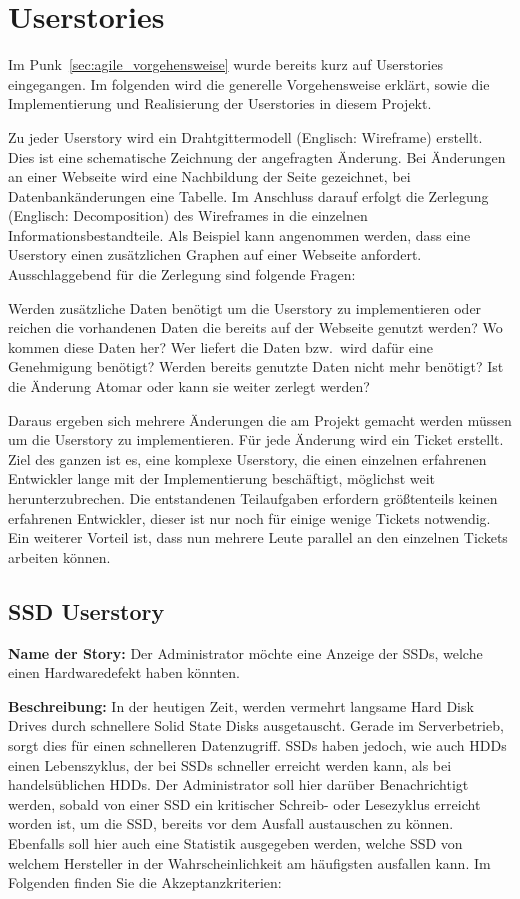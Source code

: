 \chapter{Userstories}
Im Punk~\ref{sec:agile_vorgehensweise} wurde bereits kurz auf Userstories
eingegangen. Im folgenden wird die generelle Vorgehensweise erklärt, sowie die
Implementierung und Realisierung der Userstories in diesem Projekt.

Zu jeder Userstory wird ein Drahtgittermodell (Englisch: Wireframe) erstellt.
Dies ist eine schematische Zeichnung der angefragten Änderung. Bei Änderungen
an einer Webseite wird eine Nachbildung der Seite gezeichnet, bei
Datenbankänderungen eine Tabelle. Im Anschluss darauf erfolgt die Zerlegung
(Englisch: Decomposition) des Wireframes in die einzelnen
Informationsbestandteile. Als Beispiel kann angenommen werden, dass eine
Userstory einen zusätzlichen Graphen auf einer Webseite anfordert.
Ausschlaggebend für die Zerlegung sind folgende Fragen:

\begin{outline}
  \1 Werden zusätzliche Daten benötigt um die Userstory zu implementieren oder
  reichen die vorhandenen Daten die bereits auf der Webseite genutzt werden?
  \1 Wo kommen diese Daten her?
  \1 Wer liefert die Daten bzw.\ wird dafür eine Genehmigung benötigt?
  \1 Werden bereits genutzte Daten nicht mehr benötigt?
  \1 Ist die Änderung Atomar oder kann sie weiter zerlegt werden?
\end{outline}

Daraus ergeben sich mehrere Änderungen die am Projekt gemacht werden müssen um
die Userstory zu implementieren. Für jede Änderung wird ein Ticket erstellt.
Ziel des ganzen ist es, eine komplexe Userstory, die einen einzelnen
erfahrenen Entwickler lange mit der Implementierung beschäftigt, möglichst weit
herunterzubrechen. Die entstandenen Teilaufgaben erfordern größtenteils keinen
erfahrenen Entwickler, dieser ist nur noch für einige wenige Tickets notwendig.
Ein weiterer Vorteil ist, dass nun mehrere Leute parallel an den einzelnen
Tickets arbeiten können.
\tm%

\section{SSD Userstory}
\textbf{Name der Story:} Der Administrator möchte eine Anzeige der SSDs, welche
einen Hardwaredefekt haben könnten.

\textbf{Beschreibung:} In der heutigen Zeit, werden vermehrt langsame
Hard Disk Drives durch schnellere Solid State Disks ausgetauscht. Gerade im
Serverbetrieb, sorgt dies für einen schnelleren Datenzugriff. SSDs haben
jedoch, wie auch HDDs einen Lebenszyklus, der bei SSDs schneller erreicht
werden kann, als bei handelsüblichen HDDs. Der Administrator soll hier darüber
Benachrichtigt werden, sobald von einer SSD ein kritischer Schreib- oder
Lesezyklus erreicht worden ist, um die SSD, bereits vor dem Ausfall austauschen
zu können. Ebenfalls soll hier auch eine Statistik ausgegeben werden, welche
SSD von welchem Hersteller in der Wahrscheinlichkeit am häufigsten ausfallen
kann. Im Folgenden finden Sie die Akzeptanzkriterien:

